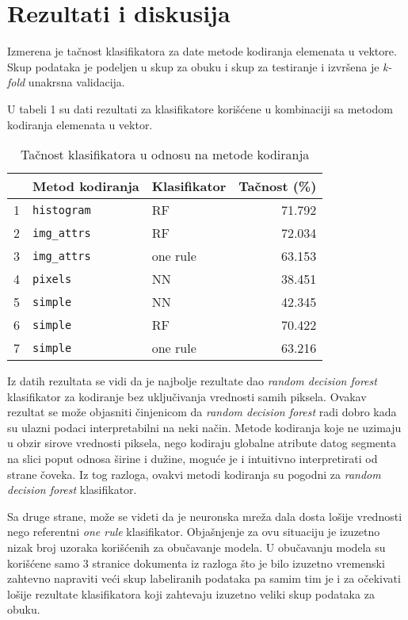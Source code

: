 \documentclass[]{amsart}
\begin{document}
\section{Rezultati i diskusija}
\label{sec:orga78d38e}


Izmerena je tačnost klasifikatora za date metode kodiranja elemenata u vektore. Skup podataka je podeljen u skup za obuku i skup za testiranje
i izvršena je \textit{k-fold} unakrsna validacija. 

U tabeli 1 su dati rezultati za klasifikatore korišćene u kombinaciji sa metodom kodiranja elemenata u vektor.


\begin{table}
\begin{tabular}{rllr}
 & Metod kodiranja & Klasifikator & Tačnost (\%)\\
\hline
1 & \texttt{histogram} & RF & 71.792\\
2 & \texttt{img\_attrs} & RF & 72.034\\
3 & \texttt{img\_attrs} & one rule & 63.153\\
4 & \texttt{pixels} & NN & 38.451\\
5 & \texttt{simple} & NN & 42.345\\
6 & \texttt{simple} & RF & 70.422\\
7 & \texttt{simple} & one rule & 63.216\\
\end{tabular}
\caption{Tačnost klasifikatora u odnosu na metode kodiranja}
\end{table}

Iz datih rezultata se vidi da je najbolje rezultate dao \textit{random decision forest} klasifikator za kodiranje bez uključivanja vrednosti samih piksela. Ovakav
rezultat se može objasniti činjenicom da \textit{random decision forest} radi dobro kada su ulazni podaci interpretabilni na neki način. 
Metode kodiranja koje ne uzimaju u obzir sirove vrednosti piksela, nego kodiraju globalne atribute datog segmenta
na slici poput odnosa širine i dužine, moguće je i intuitivno interpretirati od strane čoveka. Iz tog razloga, ovakvi metodi kodiranja su pogodni za \textit{random decision forest} klasifikator.


Sa druge strane, može se videti da je neuronska mreža dala dosta lošije vrednosti nego referentni \textit{one rule} klasifikator. Objašnjenje za ovu situaciju je
izuzetno nizak broj uzoraka korišćenih za obučavanje modela. U obučavanju modela su korišćene samo 3 stranice dokumenta iz razloga što je bilo izuzetno vremenski
zahtevno  napraviti veći skup labeliranih podataka pa samim tim je i za očekivati lošije rezultate klasifikatora koji zahtevaju izuzetno veliki skup podataka
za obuku.
\end{document}
